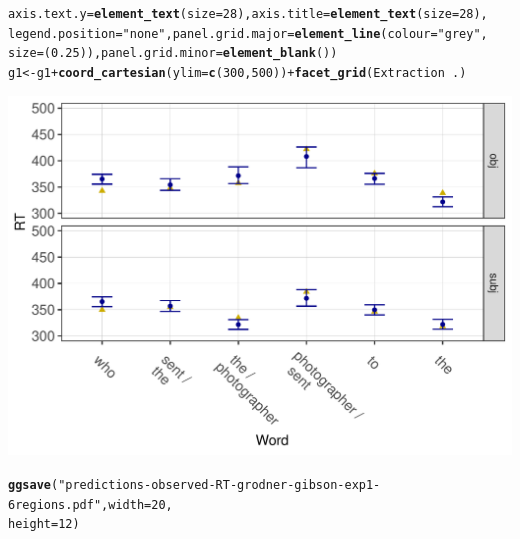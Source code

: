 \documentclass{article}\usepackage[]{graphicx}\usepackage[]{color}
\makeatletter
\def\maxwidth{ %
  \ifdim\Gin@nat@width>\linewidth
    \linewidth
  \else
    \Gin@nat@width
  \fi
}
\newcommand{\hlnum}[1]{\textcolor[rgb]{0.686,0.059,0.569}{#1}}%
\newcommand{\hlstr}[1]{\textcolor[rgb]{0.192,0.494,0.8}{#1}}%
\newcommand{\hlopt}[1]{\textcolor[rgb]{0,0,0}{#1}}%
\newcommand{\hlstd}[1]{\textcolor[rgb]{0.345,0.345,0.345}{#1}}%
\newcommand{\hlkwb}[1]{\textcolor[rgb]{0.69,0.353,0.396}{#1}}%
\newcommand{\hlkwc}[1]{\textcolor[rgb]{0.333,0.667,0.333}{#1}}%
\newcommand{\hlkwd}[1]{\textcolor[rgb]{0.737,0.353,0.396}{\textbf{#1}}}%
\newenvironment{kframe}{%
 \def\at@end@of@kframe{}%
 \ifinner\ifhmode%
  \def\at@end@of@kframe{\end{minipage}}%
  \begin{minipage}{\columnwidth}%
 \fi\fi%
 \def\FrameCommand##1{\hskip\@totalleftmargin \hskip-\fboxsep
 \colorbox{shadecolor}{##1}\hskip-\fboxsep
     \hskip-\linewidth \hskip-\@totalleftmargin \hskip\columnwidth}%
 \MakeFramed {\advance\hsize-\width
   \@totalleftmargin\z@ \linewidth\hsize
   \@setminipage}}%
 {\par\unskip\endMakeFramed%
 \at@end@of@kframe}
\newenvironment{knitrout}{}{} %
\makeatother
\begin{document}
\begin{knitrout}
\begin{kframe}
\begin{alltt}
    \hlkwc{axis.text.y} \hlstd{=} \hlkwd{element_text}\hlstd{(}\hlkwc{size} \hlstd{=} \hlnum{28}\hlstd{),} \hlkwc{axis.title} \hlstd{=} \hlkwd{element_text}\hlstd{(}\hlkwc{size} \hlstd{=} \hlnum{28}\hlstd{),}
    \hlkwc{legend.position} \hlstd{=} \hlstr{"none"}\hlstd{,} \hlkwc{panel.grid.major} \hlstd{=} \hlkwd{element_line}\hlstd{(}\hlkwc{colour} \hlstd{=} \hlstr{"grey"}\hlstd{,}
        \hlkwc{size} \hlstd{= (}\hlnum{0.25}\hlstd{)),} \hlkwc{panel.grid.minor} \hlstd{=} \hlkwd{element_blank}\hlstd{())}
\hlstd{g1} \hlkwb{<-} \hlstd{g1} \hlopt{+} \hlkwd{coord_cartesian}\hlstd{(}\hlkwc{ylim} \hlstd{=} \hlkwd{c}\hlstd{(}\hlnum{300}\hlstd{,} \hlnum{500}\hlstd{))} \hlopt{+} \hlkwd{facet_grid}\hlstd{(Extraction} \hlopt{~} \hlstd{.)}
\end{alltt}
\end{kframe}
\end{knitrout}

\begin{knitrout}
\color{fgcolor}
\includegraphics[width=\maxwidth]{figures/figure7regionsunnamed-chunk-5-1} 

\end{knitrout}


\begin{knitrout}
\color{fgcolor}\begin{kframe}
\begin{alltt}
\hlkwd{ggsave}\hlstd{(}\hlstr{"predictions-observed-RT-grodner-gibson-exp1-6regions.pdf"}\hlstd{,} \hlkwc{width} \hlstd{=} \hlnum{20}\hlstd{,}
    \hlkwc{height} \hlstd{=} \hlnum{12}\hlstd{)}
\end{alltt}
\end{kframe}
\end{knitrout}
\end{document}
